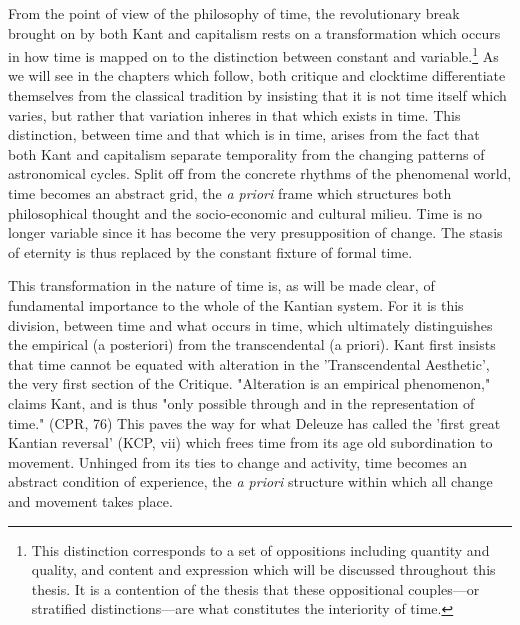 From the point of view of the philosophy of time, the revolutionary break brought on by both Kant and capitalism rests on a transformation which occurs in how time is mapped on to the distinction between constant and variable.\footnote{This distinction corresponds to a set of oppositions including quantity and quality, and content and expression which will be discussed throughout this thesis. It is a contention of the thesis that these oppositional couples---or stratified distinctions---are what constitutes the interiority of time.} As we will see in the chapters which follow, both critique and clocktime differentiate themselves from the classical tradition by insisting that it is not time itself which varies, but rather that variation inheres in that which exists in time. This distinction, between time and that which is in time, arises from the fact that both Kant and capitalism separate temporality from the changing patterns of astronomical cycles. Split off from the concrete rhythms of the phenomenal world, time becomes an abstract grid, the \textit{a priori} frame which structures both philosophical thought and the socio-economic and cultural milieu. Time is no longer variable since it has become the very presupposition of change. The stasis of eternity is thus replaced by the constant fixture of formal time.

This transformation in the nature of time is, as will be made clear, of fundamental importance to the whole of the Kantian system. For it is this division, between time and what occurs in time, which ultimately distinguishes the empirical (a posteriori) from the transcendental (a priori). Kant first insists that time cannot be equated with alteration in the 'Transcendental Aesthetic', the very first section of the Critique. "Alteration is an empirical phenomenon," claims Kant, and is thus "only possible through and in the representation of time." (CPR, 76) This paves the way for what Deleuze has called the 'first great Kantian reversal' (KCP, vii) which frees time from its age old subordination to movement. Unhinged from its ties to change and activity, time becomes an abstract condition of experience, the \textit{a priori} structure within which all change and movement takes place.

